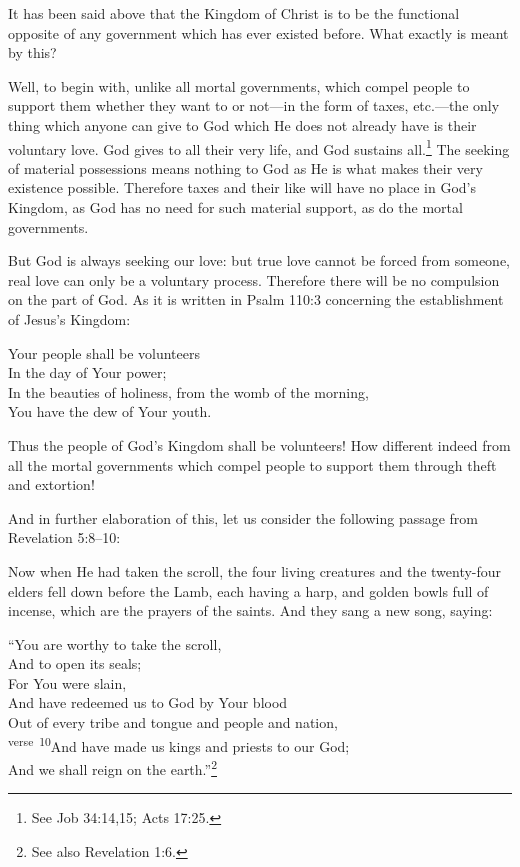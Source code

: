\documentclass[letterpaper,12pt]{article}
\newenvironment{squotation}
  {\small\quotation}
  {\endquotation\normalsize}
\newenvironment{sverse}
  {\small\verse}
  {\endverse\normalsize}
\begin{document}
It has been said above that the Kingdom of Christ is to be the functional opposite of any government which has ever existed before. What exactly is meant by this?

Well, to begin with, unlike all mortal governments, which compel people to support them whether they want to or not---in the form of taxes, etc.---the only thing which anyone can give to God which He does not already have is their voluntary love. God gives to all their very life, and God sustains all.\footnote{See Job 34:14,15; Acts 17:25.} The seeking of material possessions means nothing to God as He is what makes their very existence possible. Therefore taxes and their like will have no place in God's Kingdom, as God has no need for such material support, as do the mortal governments.

But God is always seeking our love: but true love cannot be forced from someone, real love can only be a voluntary process. Therefore there will be no compulsion on the part of God. As it is written in Psalm 110:3 concerning the establishment of Jesus's Kingdom:

\begin{sverse}
Your people shall be volunteers\\
In the day of Your power;\\
In the beauties of holiness, from the womb of the morning,\\
You have the dew of Your youth.
\end{sverse}

Thus the people of God's Kingdom shall be volunteers! How different indeed from all the mortal governments which compel people to support them through theft and extortion!

And in further elaboration of this, let us consider the following passage from Revelation 5:8--10:

\begin{squotation}
Now when He had taken the scroll, the four living creatures and the twenty-four elders fell down before the Lamb, each having a harp, and golden bowls full of incense, which are the prayers of the saints. And they sang a new song, saying:

\begin{sverse}
``You are worthy to take the scroll,\\
And to open its seals;\\
For You were slain,\\
And have redeemed us to God by Your blood\\
Out of every tribe and tongue and people and nation,\\
\textsuperscript{verse~10}And have made us kings and priests to our God;\\
And we shall reign on the earth.''\footnote{See also Revelation 1:6.}
\end{sverse}
\end{squotation}
\end{document}
